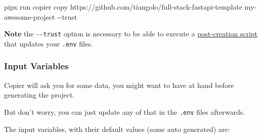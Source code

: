 \documentclass[
]{article}
\newenvironment{Shaded}{}{}
\newcommand{\AttributeTok}[1]{\textcolor[rgb]{0.49,0.56,0.16}{#1}}
\newcommand{\ExtensionTok}[1]{#1}
\newcommand{\NormalTok}[1]{#1}
\begin{document}
\begin{Shaded}
\begin{Highlighting}[]
\ExtensionTok{pipx}\NormalTok{ run copier copy https://github.com/tiangolo/full{-}stack{-}fastapi{-}template my{-}awesome{-}project }\AttributeTok{{-}{-}trust}
\end{Highlighting}
\end{Shaded}

\textbf{Note} the \texttt{-\/-trust} option is necessary to be able to
execute a
\href{https://github.com/tiangolo/full-stack-fastapi-template/blob/master/.copier/update_dotenv.py}{post-creation
script} that updates your \texttt{.env} files.

\hypertarget{input-variables}{%
\subsubsection{Input Variables}\label{input-variables}}

Copier will ask you for some data, you might want to have at hand before
generating the project.

But don't worry, you can just update any of that in the \texttt{.env}
files afterwards.

The input variables, with their default values (some auto generated)
are:
\end{document}
